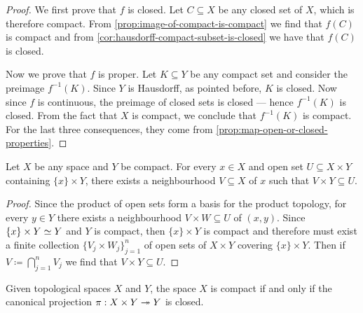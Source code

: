 \begin{proof}
We first prove that \(f\) is closed. Let \(C \subseteq X\) be any closed set of
\(X\), which is therefore compact. From \cref{prop:image-of-compact-is-compact}
we find that \(f(C)\) is compact and from
\cref{cor:hausdorff-compact-subset-is-closed} we have that \(f(C)\) is closed.

Now we prove that \(f\) is proper. Let \(K \subseteq Y\) be any compact set and
consider the preimage \(f^{-1}(K)\). Since \(Y\) is Hausdorff, as pointed
before, \(K\) is closed. Now since \(f\) is continuous, the preimage of closed
sets is closed --- hence \(f^{-1}(K)\) is closed. From the fact that \(X\) is
compact, we conclude that \(f^{-1}(K)\) is compact. For the last three
consequences, they come from \cref{prop:map-open-or-closed-properties}.
\end{proof}

\begin{lemma}
\label{lem:tube-lemma}
Let \(X\) be any space and \(Y\) be compact. For every \(x \in X\) and open set
\(U \subseteq X \times Y\) containing \(\{x\} \times Y\), there exists a
neighbourhood \(V \subseteq X\) of \(x\) such that \(V \times Y \subseteq U\).
\end{lemma}

\begin{proof}
Since the product of open sets form a basis for the product topology, for every
\(y \in Y\) there exists a neighbourhood \(V \times W \subseteq U\) of
\((x, y)\). Since \(\{x\} \times Y \simeq Y\) and \(Y\) is compact, then
\(\{x\} \times Y\) is compact and therefore must exist a finite collection
\(\{V_j \times W_j\}_{j=1}^n\) of open sets of \(X \times Y\) covering
\(\{x\} \times Y\). Then if \(V \coloneq \bigcap_{j=1}^n V_j\) we find that
\(V \times Y \subseteq U\).
\end{proof}

\begin{theorem}
\label{prop:compact-iff-projection-closed}
Given topological spaces \(X\) and \(Y\), the space \(X\) is compact if and only
if the canonical projection \(\pi: X \times Y \twoheadrightarrow Y\) is closed.
\end{theorem}

